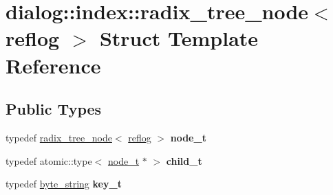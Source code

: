 \hypertarget{structdialog_1_1index_1_1radix__tree__node}{}\section{dialog\+:\+:index\+:\+:radix\+\_\+tree\+\_\+node$<$ reflog $>$ Struct Template Reference}
\label{structdialog_1_1index_1_1radix__tree__node}
\subsection*{Public Types}
\begin{DoxyCompactItemize}
\item 
\mbox{\label{structdialog_1_1index_1_1radix__tree__node_a0662b2a654d2ec8e56fe3dfe2c76f91d}} 
typedef \hyperlink{structdialog_1_1index_1_1radix__tree__node}{radix\+\_\+tree\+\_\+node}$<$ \hyperlink{classdialog_1_1monolog_1_1monolog__exp2__linear}{reflog} $>$ {\bfseries node\+\_\+t}
\item 
\mbox{\label{structdialog_1_1index_1_1radix__tree__node_a798fd98a8a69e6b92d5dad72639ba476}} 
typedef atomic\+::type$<$ \hyperlink{structdialog_1_1index_1_1radix__tree__node}{node\+\_\+t} $\ast$ $>$ {\bfseries child\+\_\+t}
\item 
\mbox{\label{structdialog_1_1index_1_1radix__tree__node_aa32bb8d1fe0da65e12965fc27dbcc9f3}} 
typedef \hyperlink{classdialog_1_1byte__string}{byte\+\_\+string} {\bfseries key\+\_\+t}
\end{DoxyCompactItemize}
